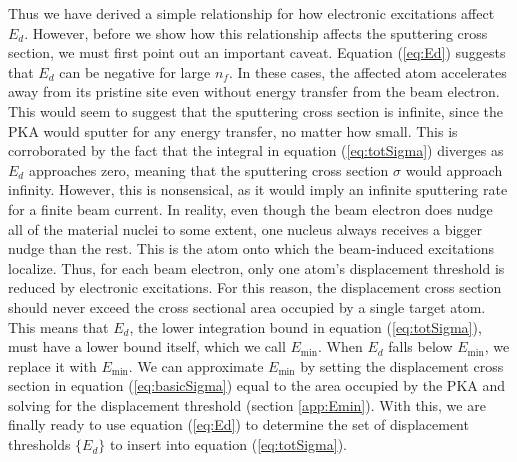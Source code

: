 \documentclass{article}
\begin{document}
Thus we have derived a simple relationship for how electronic excitations
affect $E_d$.
However, before we show how this relationship affects the sputtering cross
section, we must first point out an important caveat.
Equation (\ref{eq:Ed}) suggests that $E_d$ can be negative for large $n_f$.
In these cases, the affected atom accelerates away from its pristine site even
without energy transfer from the beam electron.
This would seem to suggest that the sputtering cross section is infinite, since
the PKA would sputter for any energy transfer, no matter how small.
This is corroborated by the fact that the integral in equation
(\ref{eq:totSigma}) diverges as $E_d$ approaches zero, meaning that the
sputtering cross section $\sigma$ would approach infinity.
However, this is nonsensical, as it would imply an infinite sputtering rate for
a finite beam current.
In reality, even though the beam electron does nudge all of the material nuclei
to some extent, one nucleus always receives a bigger nudge than the rest.
This is the atom onto which the beam-induced excitations localize.
Thus, for each beam electron, only one atom's displacement threshold is reduced
by electronic excitations.
For this reason, the displacement cross section should never exceed the
cross sectional area occupied by a single target atom.
This means that $E_d$, the lower integration bound in equation
(\ref{eq:totSigma}), must have a lower bound itself, which we call
$E_\text{min}$.
When $E_d$ falls below $E_\text{min}$, we replace it with $E_\text{min}$.
We can approximate $E_\text{min}$ by setting the displacement cross section in
equation (\ref{eq:basicSigma}) equal to the area occupied by the PKA and
solving for the displacement threshold (section \ref{app:Emin}).
With this, we are finally ready to use equation (\ref{eq:Ed}) to determine the
set of displacement thresholds $\{E_d\}$ to insert into equation
(\ref{eq:totSigma}).
\end{document}
